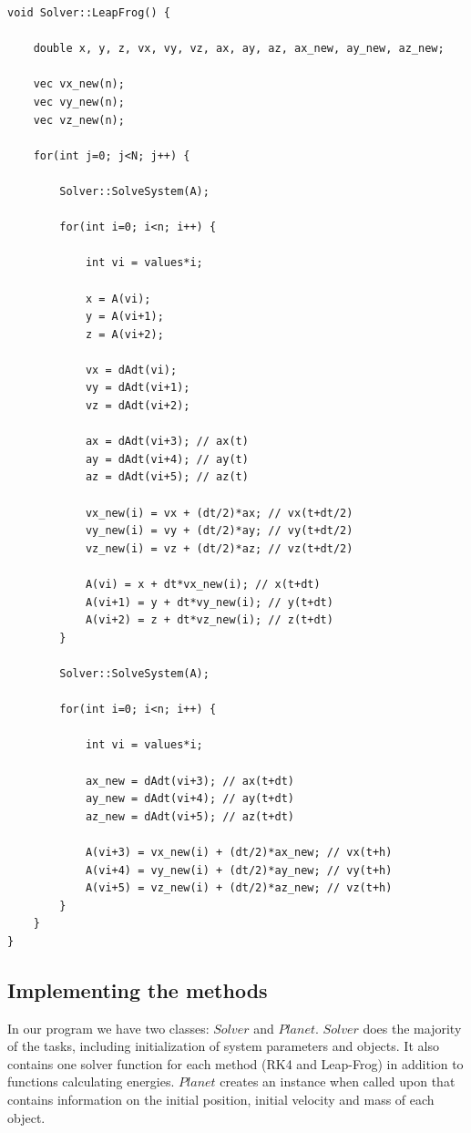 \documentclass[a4paper,12pt, english]{article}
\begin{document}
 \begin{lstlisting}[title={Function Leap Frog}]
void Solver::LeapFrog() {

    double x, y, z, vx, vy, vz, ax, ay, az, ax_new, ay_new, az_new;

    vec vx_new(n);
    vec vy_new(n);
    vec vz_new(n);

    for(int j=0; j<N; j++) {

        Solver::SolveSystem(A);

        for(int i=0; i<n; i++) {

            int vi = values*i;

            x = A(vi);
            y = A(vi+1);
            z = A(vi+2);

            vx = dAdt(vi);
            vy = dAdt(vi+1);
            vz = dAdt(vi+2);

            ax = dAdt(vi+3); // ax(t)
            ay = dAdt(vi+4); // ay(t)
            az = dAdt(vi+5); // az(t)

            vx_new(i) = vx + (dt/2)*ax; // vx(t+dt/2)
            vy_new(i) = vy + (dt/2)*ay; // vy(t+dt/2)
            vz_new(i) = vz + (dt/2)*az; // vz(t+dt/2)

            A(vi) = x + dt*vx_new(i); // x(t+dt)
            A(vi+1) = y + dt*vy_new(i); // y(t+dt)
            A(vi+2) = z + dt*vz_new(i); // z(t+dt)
        }

        Solver::SolveSystem(A);

        for(int i=0; i<n; i++) {

            int vi = values*i;

            ax_new = dAdt(vi+3); // ax(t+dt)
            ay_new = dAdt(vi+4); // ay(t+dt)
            az_new = dAdt(vi+5); // az(t+dt)

            A(vi+3) = vx_new(i) + (dt/2)*ax_new; // vx(t+h)
            A(vi+4) = vy_new(i) + (dt/2)*ay_new; // vy(t+h)
            A(vi+5) = vz_new(i) + (dt/2)*az_new; // vz(t+h)
        }
    }
}
\end{lstlisting}

\subsection*{Implementing the methods}
In our program we have two classes: $Solver$ and $Planet$. $Solver$ does the majority of the tasks, including initialization of system parameters and objects. It also contains one solver function for each method (RK4 and Leap-Frog) in addition to functions calculating energies. $Planet$ creates an instance when called upon that contains information on the initial position, initial velocity and mass of each object.
\end{document}

